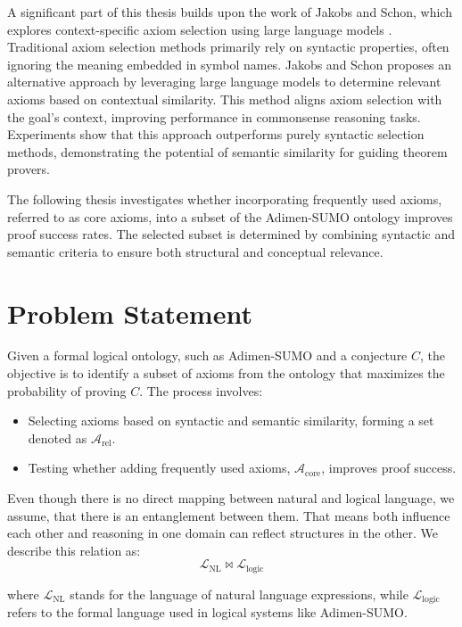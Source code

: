 \documentclass[english,version-2020-11]{uzl-thesis}
\begin{document}
A significant part of this thesis builds upon the work of Jakobs and Schon, which explores context-specific axiom selection using large language models \cite{Schon2024}. Traditional axiom selection methods primarily rely on syntactic properties, often ignoring the meaning embedded in symbol names. Jakobs and Schon proposes an alternative approach by leveraging large language models to determine relevant axioms based on contextual similarity. This method aligns axiom selection with the goal's context, improving performance in commonsense reasoning tasks. Experiments show that this approach outperforms purely syntactic selection methods, demonstrating the potential of semantic similarity for guiding theorem provers.

The following thesis investigates whether incorporating frequently used axioms, referred to as core axioms, into a subset of the Adimen-SUMO ontology improves proof success rates. The selected subset is determined by combining syntactic and semantic criteria to ensure both structural and conceptual relevance.

\section{Problem Statement}
Given a formal logical ontology, such as Adimen-SUMO and a conjecture \( C \), the objective is to identify a subset of axioms from the ontology that maximizes the probability of proving \( C \). The process involves:
\begin{itemize}
    \item Selecting axioms based on syntactic and semantic similarity, forming a set denoted as \( \mathcal{A}_{\text{rel}} \).
    \item Testing whether adding frequently used axioms, \( \mathcal{A}_{\text{core}} \), improves proof success.
\end{itemize}

Even though there is no direct mapping between natural and logical language, we assume, that there is an entanglement between them. That means both influence each other and reasoning in one domain can reflect structures in the other. We describe this relation as:\\
\begin{equation}
    \mathcal{L}_{\text{NL}} \bowtie \mathcal{L}_{\text{logic}}
\end{equation}

where \( \mathcal{L}_{\text{NL}} \) stands for the language of natural language expressions, while \( \mathcal{L}_{\text{logic}} \) refers to the formal language used in logical systems like Adimen-SUMO.
\end{document}
